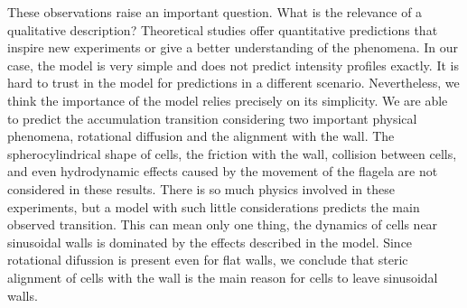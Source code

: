 
\newpage
These observations raise an important question. What is the relevance of a qualitative description? Theoretical studies offer quantitative predictions that inspire new experiments or give a better understanding of the phenomena. In our case, the model is very simple and does not predict intensity profiles exactly. It is hard to trust in the model for predictions in a different scenario. Nevertheless, we think the importance of the model relies precisely on its simplicity. We are able to predict the accumulation transition considering two important physical phenomena, rotational diffusion and the alignment with the wall. The spherocylindrical shape of cells, the friction with the wall, collision between cells, and even hydrodynamic effects caused by the movement of the flagela are not considered in these results. There is so much physics involved in these experiments, but a model with such little considerations predicts the main observed transition. This can mean only one thing, the dynamics of cells near sinusoidal walls is dominated by the effects described in the model. Since rotational difussion is present even for flat walls, we conclude that steric alignment of cells with the wall is the main reason for cells to leave sinusoidal walls. 



